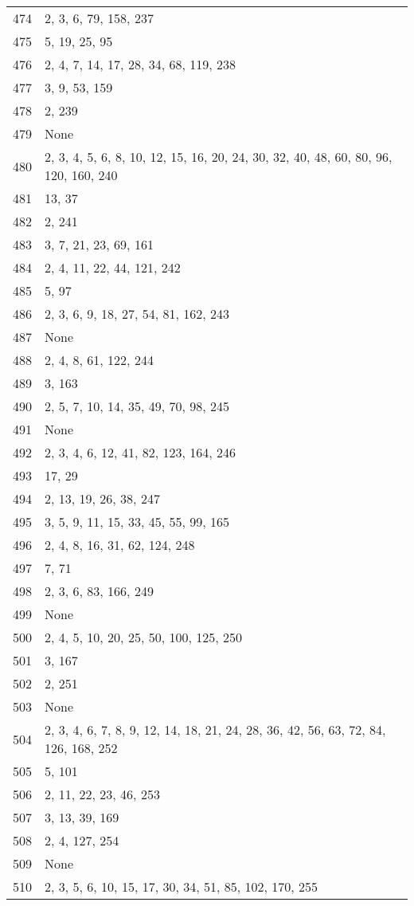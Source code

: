 \documentclass[12pt]{article}
\begin{document}
\begin{tabular}{|r|l|}
474 & 2, 3,  6, 79, 158, 237 \\ 
475 & 5, 19, 25, 95 \\ 
476 & 2, 4, 7, 14, 17, 28, 34, 68, 119,  238 \\ 
477 & 3, 9, 53, 159 \\ 
478 & 2, 239 \\ 
479 & None \\ 
480 & 2, 3, 4, 5, 6, 8, 10, 12, 15, 16, 20, 24, 30, 32, 40, 48, 60, 80,  96, 120, 160, 240 \\ 
481 & 13, 37 \\ 
482 & 2, 241 \\ 
483 & 3, 7, 21, 23, 69, 161 \\ 
484 & 2, 4, 11, 22, 44, 121, 242 \\ 
485 & 5,  97 \\ 
486 & 2, 3, 6, 9, 18, 27, 54, 81, 162, 243 \\ 
487 & None \\ 
488 & 2, 4, 8, 61, 122, 244 \\ 
489 & 3, 163 \\ 
490 & 2, 5, 7, 10, 14, 35, 49, 70, 98, 245 \\ 
491 & None \\ 
492 & 2, 3, 4, 6, 12, 41, 82, 123, 164, 246 \\ 
493 & 17, 29 \\ 
494 & 2, 13,  19, 26, 38, 247 \\ 
495 & 3, 5, 9, 11, 15, 33, 45, 55, 99, 165 \\ 
496 & 2, 4, 8, 16, 31, 62,  124, 248 \\ 
497 & 7,  71 \\ 
498 & 2, 3, 6, 83, 166, 249 \\ 
499 & None \\ 
500 & 2, 4, 5, 10, 20, 25, 50, 100, 125, 250 \\ 
501 & 3, 167 \\ 
502 & 2, 251 \\ 
503 & None \\ 
504 & 2, 3,  4, 6, 7, 8, 9, 12, 14, 18, 21, 24, 28, 36, 42, 56, 63, 72, 84, 126, 168, 252 \\ 
505 & 5, 101 \\ 
506 & 2, 11, 22, 23, 46, 253 \\ 
507 & 3, 13, 39, 169 \\ 
508 & 2, 4, 127, 254 \\ 
509 & None \\ 
510 & 2, 3, 5, 6, 10, 15, 17, 30, 34, 51, 85,  102, 170, 255 \\ 

\end{tabular}
\end{document}
